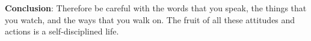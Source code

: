 \textbf{Conclusion}:  Therefore be careful with the words that you speak, the things that you watch, and the ways that you walk on. The fruit of all these attitudes and actions is a self-disciplined life.



